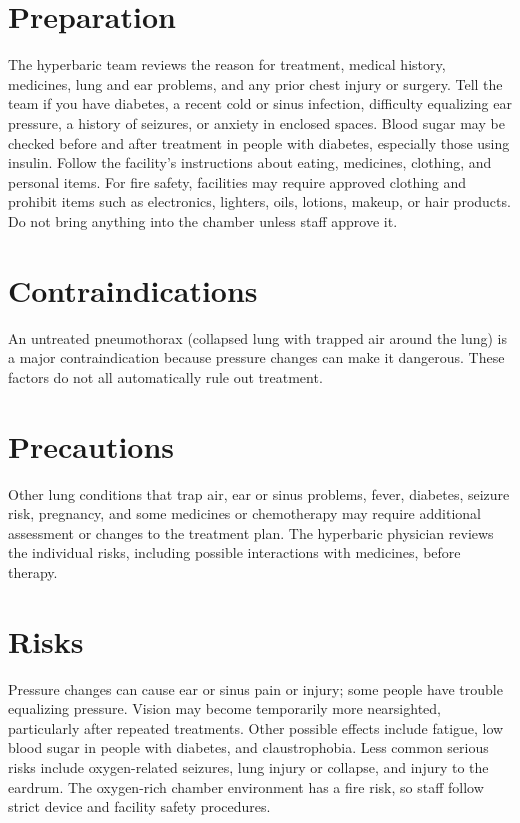 \section*{Preparation}
The hyperbaric team reviews the reason for treatment, medical history, medicines, lung and ear problems, and any prior chest injury or surgery. Tell the team if you have diabetes, a recent cold or sinus infection, difficulty equalizing ear pressure, a history of seizures, or anxiety in enclosed spaces. Blood sugar may be checked before and after treatment in people with diabetes, especially those using insulin. Follow the facility's instructions about eating, medicines, clothing, and personal items. For fire safety, facilities may require approved clothing and prohibit items such as electronics, lighters, oils, lotions, makeup, or hair products. Do not bring anything into the chamber unless staff approve it.

\section*{Contraindications}
An untreated pneumothorax (collapsed lung with trapped air around the lung) is a major contraindication because pressure changes can make it dangerous. These factors do not all automatically rule out treatment.

\section*{Precautions}
Other lung conditions that trap air, ear or sinus problems, fever, diabetes, seizure risk, pregnancy, and some medicines or chemotherapy may require additional assessment or changes to the treatment plan. The hyperbaric physician reviews the individual risks, including possible interactions with medicines, before therapy.

\section*{Risks}
Pressure changes can cause ear or sinus pain or injury; some people have trouble equalizing pressure. Vision may become temporarily more nearsighted, particularly after repeated treatments. Other possible effects include fatigue, low blood sugar in people with diabetes, and claustrophobia. Less common serious risks include oxygen-related seizures, lung injury or collapse, and injury to the eardrum. The oxygen-rich chamber environment has a fire risk, so staff follow strict device and facility safety procedures.

